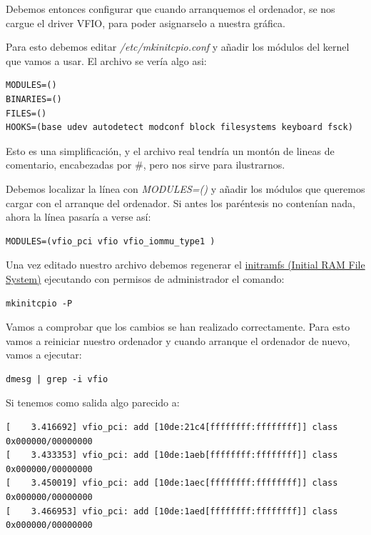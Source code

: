 \documentclass[12pt]{article}
\begin{document}
Debemos entonces configurar que cuando arranquemos el ordenador, se nos cargue el driver VFIO, para poder asignarselo a nuestra gráfica.

Para esto debemos editar \emph{/etc/mkinitcpio.conf} y añadir los módulos del kernel que vamos a usar. El archivo se vería algo asi:

\begin{verbatim}
MODULES=()
BINARIES=()
FILES=()
HOOKS=(base udev autodetect modconf block filesystems keyboard fsck)
\end{verbatim}

Esto es una simplificación, y el archivo real tendría un montón de lineas de comentario, encabezadas por \#, pero nos sirve para ilustrarnos.

Debemos localizar la línea con \emph{MODULES=()} y añadir los módulos que queremos cargar con el arranque del ordenador. Si antes los paréntesis no contenían nada, ahora la línea pasaría a verse así:

\begin{verbatim}
MODULES=(vfio_pci vfio vfio_iommu_type1 )
\end{verbatim}

Una vez editado nuestro archivo debemos regenerar el \href{https://en.wikipedia.org/wiki/Initial\_ramdisk}{initramfs (Initial RAM File System)} ejecutando con permisos de administrador el comando:

\begin{verbatim}
mkinitcpio -P
\end{verbatim}

Vamos a comprobar que los cambios se han realizado correctamente. Para esto vamos a reiniciar nuestro ordenador y cuando arranque el ordenador de nuevo, vamos a ejecutar:

\begin{verbatim}
dmesg | grep -i vfio
\end{verbatim}

Si tenemos como salida algo parecido a:

\begin{lstlisting}[basicstyle=\scriptsize\ttfamily]
[    3.416692] vfio_pci: add [10de:21c4[ffffffff:ffffffff]] class 0x000000/00000000
[    3.433353] vfio_pci: add [10de:1aeb[ffffffff:ffffffff]] class 0x000000/00000000
[    3.450019] vfio_pci: add [10de:1aec[ffffffff:ffffffff]] class 0x000000/00000000
[    3.466953] vfio_pci: add [10de:1aed[ffffffff:ffffffff]] class 0x000000/00000000
\end{lstlisting}
\end{document}
